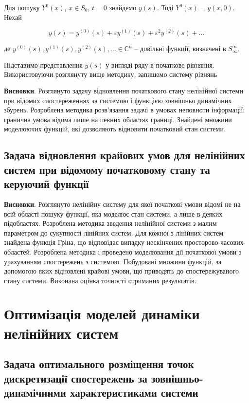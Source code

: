 Для пошуку $Y^{0}(x)$, $x\in S_{0}$, $t=0$ знайдемо $y(s)$.
Тоді  $Y^{0}(x)=y(x,0)$.
Нехай

\[
    y(s)=y^{(0)}(s) + \varepsilon y^{(1)}(s) + \varepsilon^2 y^{(2)}(s) + \dots
\]

де $y^{(0)}(s), y^{(1)}(s), y^{(2)}(s),\dots\in\mathbb{C}^{n}$ -- довільні функції, визначені в $S_{\infty}^{\infty}$.

Підставимо представлення $y(s)$ у вигляді ряду в початкове рівняння. Використовуючи розглянуту вище методику, запишемо систему рівнянь




\textbf{Висновки}. Розглянуто задачу відновлення початкового стану нелінійної системи при відомих спостереженнях за
системою і функцією зовнішньо динамічних збурень. Розроблена методика розв’язання задачі в умовах неповноти
інформації: гранична умова відома лише на певних областях границі. Знайдені множини моделюючих функцій,
які дозволяють відновити початковий стан системи.

\subsection{Задача відновлення крайових умов для нелінійних систем при відомому початковому
стану та керуючий функції} \label{sect3_1_2}

\textbf{Висновки}. Розглянуто нелінійну систему для якої початкові умови відомі не на всій області пошуку функції,
яка моделює стан системи, а лише в деяких підобластях. Розроблена методика зведення нелінійної системи з малим
параметром до сукупності лінійних систем. Для кожної з лінійних систем знайдена функція Гріна, що відповідає
випадку нескінчених просторово-часових областей. Розроблена методика і проведено моделювання дії початкової
умови з урахуванням спостережень з системою. Побудовані множини функцій, за допомогою яких відновлені крайові
умови, що приводять до спостережуваного стану системи. Виконана оцінка точності отриманих результатів.

\section{Оптимізація моделей динаміки нелінійних систем} \label{sect3_2}

\subsection{Задача оптимального розміщення  точок дискретизації спостережень за зовнішньо-динамічними
характеристиками системи} \label{sect3_2_1}

